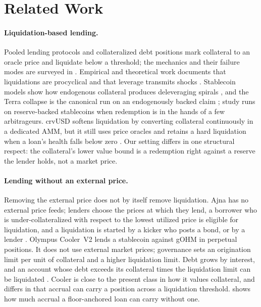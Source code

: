 \section{Related Work}\label{sec:related}

\paragraph{Liquidation-based lending.} Pooled lending protocols and collateralized debt positions mark collateral to an oracle price and liquidate below a threshold; the mechanics and their failure modes are surveyed in \citep{bartoletti2021,werner2022sok,gudgeon2020}. Empirical and theoretical work documents that liquidations are procyclical and that leverage transmits shocks \citep{perez2021,qin2021liquidations,heimbach2024leverage,tian2025,lehar2022,chiu2023}. Stablecoin models show how endogenous collateral produces deleveraging spirals \citep{klagesmundt2020,klagesmundt2021,kozhan2021}, and the Terra collapse is the canonical run on an endogenously backed claim \citep{liu2023terra}; \citet{ma2025} study runs on reserve-backed stablecoins when redemption is in the hands of a few arbitrageurs. crvUSD softens liquidation by converting collateral continuously in a dedicated AMM, but it still uses price oracles and retains a hard liquidation when a loan's health falls below zero \citep{crvusd,crvusddocs}. Our setting differs in one structural respect: the collateral's lower value bound is a redemption right against a reserve the lender holds, not a market price.

\paragraph{Lending without an external price.} Removing the external price does not by itself remove liquidation. Ajna has no external price feeds; lenders choose the prices at which they lend, a borrower who is under-collateralized with respect to the lowest utilized price is eligible for liquidation, and a liquidation is started by a kicker who posts a bond, or by a lender \citep{ajna}. Olympus Cooler~V2 lends a stablecoin against gOHM in perpetual positions. It does not use external market prices; governance sets an origination limit per unit of collateral and a higher liquidation limit. Debt grows by interest, and an account whose debt exceeds its collateral times the liquidation limit can be liquidated \citep{nethermindcooler}. Cooler is close to the present class in how it values collateral, and differs in that accrual can carry a position across a liquidation threshold.  shows how much accrual a floor-anchored loan can carry without one.

